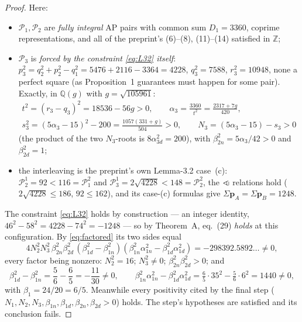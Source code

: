 \documentclass[11pt]{amsart}
\theoremstyle{remark}
\newcommand{\Q}{\mathbb{Q}}
\newcommand{\Z}{\mathbb{Z}}
\newcommand{\cP}{\mathcal{P}}
\begin{document}
\begin{proof}
\noindent Here:
\begin{itemize}
\item $\cP_1, \cP_2$ are \emph{fully integral} AP pairs with common sum
  $D_1 = 3360$, coprime representations, and all of the preprint's
  (6)--(8), (11)--(14) satisfied in $\Z$;
\item $\cP_3$ is \emph{forced by the constraint \eqref{eq:L32}
  itself}: $p_3^2 = q_2^2 + p_2^2 - q_1^2 = 5476 + 2116 - 3364 =
  4228$, $q_3^2 = 7588$, $r_3^2 = 10948$, none a perfect square (as
  Proposition~1 guarantees must happen for some pair). Exactly, in
  $\Q(g)$ with $g = \sqrt{105961}$:
  \begin{gather*}
  t^2 = (r_3 - q_3)^2 = 18536 - 56g > 0, \qquad
  \alpha_3 = \frac{3360}{t^2} = \frac{2317 + 7g}{420},\\
  s_3^2 = (5\alpha_3 - 15)^2 - 200 = \frac{1057(331 + g)}{504} > 0,
  \qquad
  N_3 = (5\alpha_3 - 15) - s_3 > 0
  \end{gather*}
  (the product of the two $N_3$-roots is $8\alpha_{3d}^2 = 200$), with
  $\beta_{2n}^2 = 5\alpha_3/42 > 0$ and $\beta_{2d}^2 = 1$;
\item the interleaving is the preprint's own Lemma-3.2 case~(c):
  $\cP_2^1 = 92 < 116 = \cP_1^2$ and $\cP_3^1 = 2\sqrt{4228} < 148 =
  \cP_2^2$, the $<\!\!\shortparallel$ relations hold ($2\sqrt{4228}
  \le 186$, $92 \le 162$), and its case-(c) formulas give
  $\Sigma\mathbf{p}_A = \Sigma\mathbf{p}_B = 1248$.
\end{itemize}
The constraint \eqref{eq:L32} holds by construction --- an integer
identity, $46^2 - 58^2 = 4228 - 74^2 = -1248$ --- so by Theorem~A,
eq.~(29) \emph{holds} at this configuration. By
\eqref{eq:factored} its two sides equal
\begin{equation*}
4N_2^2N_3^2\,\beta_{2n}^2\beta_{2d}^2\,
(\beta_{1d}^2 - \beta_{1n}^2)(\beta_{1n}^2\alpha_{1n}^2 -
\beta_{1d}^2\alpha_{1d}^2) = -298392.5892\ldots \neq 0,
\end{equation*}
every factor being nonzero: $N_2^2 = 16$; $N_3^2 \neq 0$;
$\beta_{2n}^2\beta_{2d}^2 > 0$; and
\begin{equation*}
\beta_{1d}^2 - \beta_{1n}^2 = \frac56 - \frac65 = -\frac{11}{30}
\neq 0, \qquad
\beta_{1n}^2\alpha_{1n}^2 - \beta_{1d}^2\alpha_{1d}^2
 = \tfrac65\cdot 35^2 - \tfrac56\cdot 6^2 = 1440 \neq 0,
\end{equation*}
with $\beta_1 = 24/20 = 6/5$. Meanwhile every positivity cited by the
final step ($N_1, N_2, N_3, \beta_{1n}, \beta_{1d}, \beta_{2n},
\beta_{2d} > 0$) holds. The step's hypotheses are satisfied and its
conclusion fails.
\end{proof}
\end{document}
